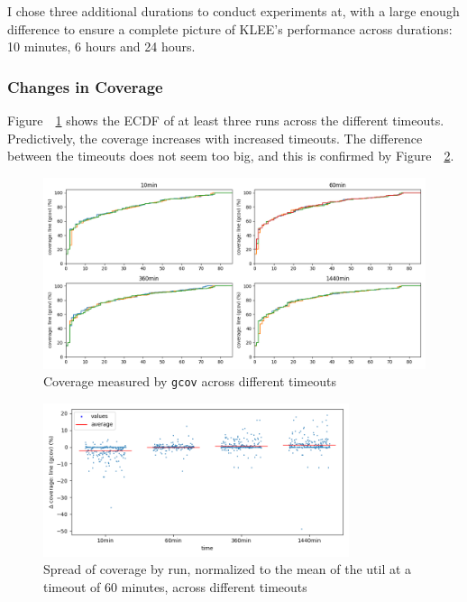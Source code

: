 \documentclass{article}
\let\savedRef=\ref
\renewcommand{\ref}{\unskip~\savedRef}
\begin{document}
I chose three additional durations to conduct experiments at, with a large enough difference to ensure a complete picture of KLEE's performance across durations: 10 minutes, 6 hours and 24 hours.

\subsubsection{Changes in Coverage}

Figure~\ref{fig:ecdf_across_times} shows the ECDF of at least three runs across the different timeouts. Predictively, the coverage increases with increased timeouts. The difference between the timeouts does not seem too big, and this is confirmed by Figure~\ref{fig:spread_across_times_gcov}.


\begin{figure}[ht]
    \centering
    \includegraphics[width=1\textwidth]{../plots/gcov_cov/ecdf_by_time.png}
    \caption{Coverage measured by \lstinline{gcov} across different timeouts}
    \label{fig:ecdf_across_times}
\end{figure}

\begin{figure}[ht]
    \centering
    \includegraphics[width=0.8\textwidth]{../plots/gcov_cov/changes-by-time.png}
    \captionsetup{width=0.6\textwidth}
    \caption{Spread of coverage by run, normalized to the mean of the util at a timeout of 60 minutes, across different timeouts}
    \label{fig:spread_across_times_gcov}
\end{figure}
\end{document}

